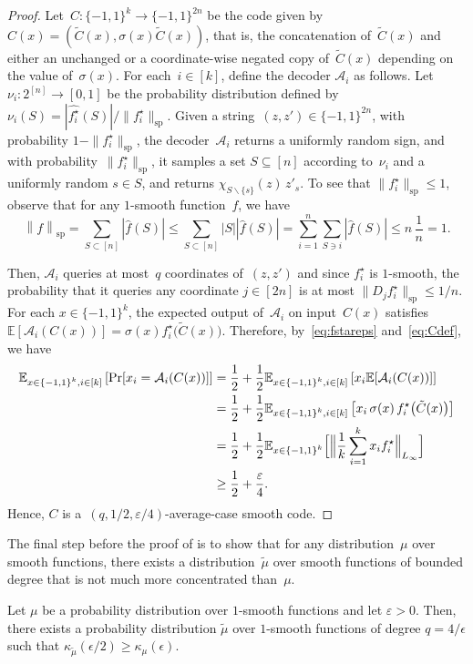 \documentclass{toc}
\newcommand{\pmset}[1]{\{-1,1\}^{#1}} %
\newcommand{\sBC}{{\{-1,1\}}}
\newcommand{\E}{\mathbb{E}}
\newcommand{\specnorm}[1]{\left\lVert #1 \right\rVert_{\mathrm{sp}}}
\newcommand{\eps}{\varepsilon}
\renewcommand{\Pr}{\mbox{\rm Pr}}
\newcommand{\cA}{{\mathcal A}}
\DeclareMathOperator{\Anorm}{sp}
\newcommand{\beqn}{\begin{equation*}}
\newcommand{\eeqn}{\end{equation*}}
\begin{document}
\begin{proof}
Let~$C:\pmset{k}\to\pmset{2n}$ be the code given by $C(x) = (\tilde C(x), \sigma(x)\tilde C(x))$,
that is, the concatenation of~$\tilde C(x)$ and either an unchanged or a coordinate-wise negated copy of~$\tilde C(x)$ depending on the value of~$\sigma(x)$.
For each~$i\in[k]$, define the decoder $\cA_i$ as follows.
Let $\nu_i:2^{[n]}\to[0,1]$ be the probability distribution defined by $\nu_i(S) = |\widehat{f_i^\star}(S)|/\|f_i^\star\|_{\Anorm}$.
Given a string~$(z,z')\in\pmset{2n}$, with probability $1 -\|f_i^\star\|_{\Anorm}$, the decoder~$\mathcal A_i$ returns a uniformly random sign, and with probability~$\|f_i^\star\|_{\Anorm}$, it samples a set $S\subseteq[n]$ according to~$\nu_i$ and a uniformly random $s\in S$, and returns $\chi_{S\smallsetminus\{s\}}(z)\, z'_s$.
To see that $\|f_i^\star\|_{\Anorm}\le 1$, observe that for any $1$-smooth function~$f$, we have
\beqn
\specnorm{f}=\sum_{S\subset [n]}|\widehat{f}(S)|\le \sum_{S\subset [n]}|S||\widehat{f}(S)|=\sum_{i=1}^n\sum_{S\ni i} |\widehat{f}(S)| \le n\, \frac{1}{n}=1.
\eeqn

Then, $\mathcal A_i$ queries at most~$q$ coordinates of~$(z,z')$ and since $f_i^\star$ is $1$-smooth, the probability that it queries any coordinate $j\in[2n]$ is at most $\|D_jf_i^\star\|_{\Anorm} \le 1/n$.
For each $x\in \pmset{k}$, the expected output of~$\mathcal A_i$ on input~$C(x)$ satisfies $\E[\cA_i(C(x))] = \sigma(x) f_i^\star\big(\tilde C(x)\big)$.
Therefore, by~\eqref{eq:fstareps} and~\eqref{eq:Cdef}, we have
\begin{align*}
\E_{x\in \sBC^k, i\in [k]}\left[\Pr[x_i=\cA_i(C(x))]\right]&=\frac{1}{2}+\frac{1}{2}\E_{x\in \sBC^k, i\in [k]}\left[x_i\E[\cA_i(C(x))]\right]\\
&=\frac{1}{2}+\frac{1}{2}\E_{x\in \sBC^k, i\in [k]}\left[x_i\, \sigma(x)\,f_i^\star\big(\tilde C(x)\big)\right]\\
&=
\frac{1}{2}+\frac{1}{2}
\E_{x\in \sBC^k}\Big[\Big\|\frac{1}{k}\sum_{i=1}^k x_if_i^\star\Big\|_{L_\infty}\Big]\\
&\ge \frac{1}{2}+\frac{\eps}{4}.
\end{align*}
Hence, $C$ is a~$(q, 1/2, \eps/4)$-average-case smooth code.
\end{proof}

The final step before the proof of  is to show that for any distribution~$\mu$ over smooth functions, there exists a distribution~$\tilde\mu$ over smooth functions of bounded degree that is not much more concentrated than~$\mu$.

\begin{lemma}
\label{lem:truncate_smooth_dist}
Let $\mu$ be a probability distribution over $1$-smooth functions and let  $\eps>0$.
Then, there exists a probability distribution $\tilde{\mu}$ over $1$-smooth functions of degree $q=4/\epsilon$ such that $\kappa_{\tilde{\mu}}(\epsilon/2)\ge \kappa_\mu(\epsilon)$.
\end{lemma}
\end{document}
